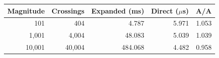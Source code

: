 \begin{tabular}{@{}rrrrr@{}}
\toprule
Magnitude & Crossings & Expanded (ms) & Direct ($\mu$s) & A/A \\
\midrule
101 & 404 & 4.787 & 5.971 & 1.053 \\
1,001 & 4,004 & 48.083 & 5.039 & 1.039 \\
10,001 & 40,004 & 484.068 & 4.482 & 0.958 \\
\bottomrule
\end{tabular}
